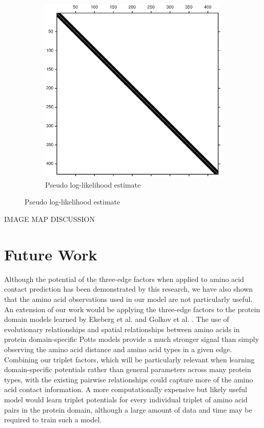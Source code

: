 \documentclass{article}
\begin{document}
\begin{figure}
\begin{subfigure}{0.3\textwidth}
\includegraphics[width=\linewidth]{paper_images/pll_adj.eps}
\centering
\caption{Pseudo log-likelihood estimate}
\end{subfigure}
\end{figure}

IMAGE MAP DISCUSSION


\section{Future Work}
Although the potential of the three-edge factors when applied to amino acid contact prediction has been demonstrated by this research, we have also shown that the amino acid observations used in our model are not particularly useful. An extension of our work would be applying the three-edge factors to the protein domain models learned by Ekeberg et al. and Golkov et al. \cite{ekeberg13} \cite{golkov16}. The use of evolutionary relationships and spatial relationships between amino acids in protein domain-specific Potts models provide a much stronger signal than simply observing the amino acid distance and amino acid types in a given edge. Combining our triplet factors, which will be particularly relevant when learning domain-specific potentials rather than general parameters across many protein types, with the existing pairwise relationships could capture more of the amino acid contact information. A more computationally expensive but likely useful model would learn triplet potentials for every individual triplet of amino acid pairs in the protein domain, although a large amount of data and time may be required to train such a model. 
\end{document}
